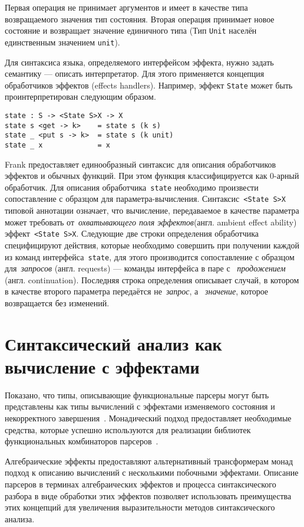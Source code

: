 \documentclass [a4paper] {article}
\begin{document}
Первая операция не принимает аргументов и имеет в качестве типа возвращаемого
значения тип состояния. Вторая операция принимает новое состояние и возвращает
значение единичного типа (Тип \texttt{Unit} населён единственным значением
\texttt{unit}).

Для синтаксиса языка, определяемого интерфейсом эффекта, нужно задать
семантику --- описать интерпретатор. Для этого применяется концепция
обработчиков эффектов  (effects handlers). Например, эффект \texttt{State}
может быть проинтерпретирован следующим образом.

\begin{verbatim}
state : S -> <State S>X -> X
state s <get -> k>    = state s (k s)
state _ <put s -> k>  = state s (k unit)
state _ x             = x
\end{verbatim}

Frank предоставляет единообразный синтаксис для описания обработчиков эффектов
и обычных функций. При этом функция классифицируется как 0-арный обработчик.
Для описания обработчика~\texttt{state} необходимо произвести сопоставление с
образцом для параметра-вычисления. Синтаксис~\texttt{<State S>X} типовой
аннотации означает, что вычисление, передаваемое в качестве параметра может
требовать от~\emph{охватывающего поля эффектов}(англ. ambient effect ability)
эффект~\texttt{<State S>X}. Следующие две строки определения обработчика
специфицируют действия, которые необходимо совершить при получении каждой из
команд интерфейса~\texttt{state}, для этого производится сопоставление с
образцом для~\emph{запросов} (англ. requests) --- команды интерфейса в паре с
~\emph{продожением} (англ. continuation). Последняя строка определения описывает
случай, в котором в качестве второго параметра передаётся не~\emph{запрос}, а
~\emph{значение}, которое возвращается без изменений.

\section{Синтаксический анализ как вычисление с эффектами}

Показано, что типы, описывающие функциональные парсеры могут быть представлены
как типы вычислений с эффектами изменяемого состояния и некорректного
завершения~\cite{monParsing}. Монадический подход предоставляет
необходимые средства, которые успешно используются для реализации библиотек
функциональных комбинаторов парсеров~\cite{parsec}.

Алгебраические эффекты предоставляют альтернативный трансформерам монад подход к
описанию вычислений с несколькими побочными эффектами. Описание парсеров в
терминах алгебраических эффектов и процесса синтаксического разбора в виде
обработки этих эффектов позволяет использовать преимущества этих концепций
для увеличения выразительности методов синтаксического анализа.
\end{document}
